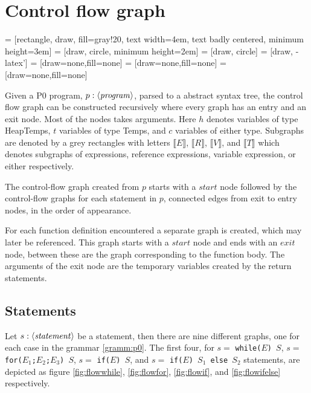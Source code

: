 \section{Control flow graph}
 = [rectangle, draw, fill=gray!20, text width=4em, text badly centered, minimum height=3em]
 = [draw, circle, minimum height=2em]
 = [draw, circle]
 = [draw, -latex']
 = [draw=none,fill=none]
 = [draw=none,fill=none]
 = [draw=none,fill=none]
\newcommand{\subt}[1]{\llbracket #1\rrbracket}

Given a P0 program, $p : \langle\mathit{program}\rangle$, parsed to a abstract syntax tree, the control flow graph can be constructed recursively where every graph has an entry and an exit node. Most of the nodes takes arguments. Here $h$ denotes variables of type HeapTemps, $t$ variables of type Temps, and $c$ variables of either type. Subgraphs are denoted by a grey rectangles with letters $\subt{E}$, $\subt{R}$, $\subt{V}$, and $\subt{T}$ which denotes subgraphs of expressions, reference expressions, variable expression, or either respectively. 

The control-flow graph created from $p$ starts with a $start$ node followed by the control-flow graphs for each statement in $p$, connected edges from exit to entry nodes, in the order of appearance. 

For each function definition encountered a separate graph is created, which may later be referenced. This graph starts with a $start$ node and ends with an $exit$ node, between these are the graph corresponding to the function body. The arguments of the exit node are the temporary variables created by the return statements. 

\subsection{Statements}
Let $s : \langle\mathit{statement}\rangle$ be a statement, then there are nine different graphs, one for each case in the grammar \ref{gramm:p0}. The first four, for $s = $ \texttt{while($E$) $S$}, $s = $ \texttt{for($E_1$;$ E_2$;$E_3$) $S$}, $s = $ \texttt{if($E$) $S$}, and $s = $ \texttt{if($E$) $S_1$ else $S_2$} statements, are depicted as figure \ref{fig:flowwhile}, \ref{fig:flowfor}, \ref{fig:flowif}, and \ref{fig:flowifelse} respectively.


